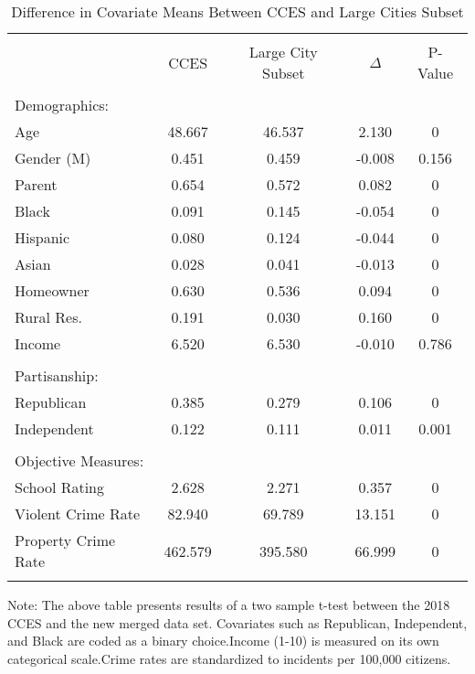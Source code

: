 \begin{table}[H] \centering 
  \caption{Difference in Covariate Means Between CCES and Large Cities Subset} 
  \label{} 
\begin{tabular}{@{\extracolsep{5pt}} lcccc} 
\\[-1.8ex]\hline 
\hline \\[-1.8ex] 
 & CCES & Large City Subset & $\Delta$ & P-Value \\ 
\hline \\[-1.8ex] 
Demographics: &&&&\\
\hline
Age & 48.667 & 46.537 & 2.130 & 0 \\ 
Gender (M) & 0.451 & 0.459 & -0.008 & 0.156 \\ 
Parent & 0.654 & 0.572 & 0.082 & 0 \\ 
Black & 0.091 & 0.145 & -0.054 & 0 \\ 
Hispanic & 0.080 & 0.124 & -0.044 & 0 \\ 
Asian & 0.028 & 0.041 & -0.013 & 0 \\ 
Homeowner & 0.630 & 0.536 & 0.094 & 0 \\ 
Rural Res. & 0.191 & 0.030 & 0.160 & 0 \\
Income & 6.520 & 6.530 & -0.010 & 0.786 \\\\
Partisanship: &&&&\\
\hline
Republican & 0.385 & 0.279 & 0.106 & 0 \\ 
Independent & 0.122 & 0.111 & 0.011 & 0.001 \\\\
Objective Measures: &&&&\\
\hline
School Rating & 2.628 & 2.271 & 0.357 & 0 \\ 
Violent Crime Rate & 82.940 & 69.789 & 13.151 & 0 \\ 
Property Crime Rate & 462.579 & 395.580 & 66.999 & 0 \\ 
\hline \\[-1.8ex] 
\end{tabular} 
\begin{tablenotes}
    \item {\footnotesize Note: The above table presents results of a two sample t-test between the 2018 CCES and the new merged data set. Covariates such as Republican, Independent, and Black are coded as a binary choice.Income (1-10) is measured on its own categorical scale.Crime rates are standardized to incidents per 100,000 citizens.}
\end{tablenotes}
\end{table} 


